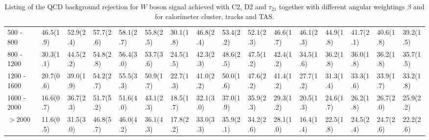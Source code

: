 \begin{table}
{\begin{tabular}{llllllllllllllll}
\multicolumn{1}{l||}{500 - 800} & 	\multicolumn{1}{l|}{46.5(1.9)} & \multicolumn{1}{l|}{52.9(2.4)} & \multicolumn{1}{l|}{57.7(2.6)} 						& \multicolumn{1}{l|}{58.1(2.7)} 	& \multicolumn{1}{l||}{55.8(2.5)} & \multicolumn{1}{l|}{30.1(1.8)} & \multicolumn{1}{l|}{46.8(2.4)} & \multicolumn{1}{l|}{53.4(2.2)} 						& \multicolumn{1}{l|}{52.1(2.3)} & \multicolumn{1}{l||}{46.6(1.7)} & \multicolumn{1}{l|}{46.1(2.3)} & \multicolumn{1}{l|}{44.9(1.8)} & \multicolumn{1}{l|}{41.7(2.1)} & \multicolumn{1}{l|}{40.6(1.8)} & \multicolumn{1}{l|}{39.2(1.5)} \\
\multicolumn{1}{l||}{800 - 1200} & 	\multicolumn{1}{l|}{30.3(1.1)} & \multicolumn{1}{l|}{44.5(2.2)} & \multicolumn{1}{l|}{54.8(2.8)} 						& \multicolumn{1}{l|}{56.4(3.0)} 	& \multicolumn{1}{l||}{53.7(3.6)} & \multicolumn{1}{l|}{24.5(1.5)} & \multicolumn{1}{l|}{42.3(2.3)} & \multicolumn{1}{l|}{48.6(2.5)} 						& \multicolumn{1}{l|}{47.5(1.2)} & \multicolumn{1}{l||}{42.4(1.2)} & \multicolumn{1}{l|}{34.5(1.6)} & \multicolumn{1}{l|}{36.2(1.8)} & \multicolumn{1}{l|}{36.0(1.8)} & \multicolumn{1}{l|}{36.2(1.8)} & \multicolumn{1}{l|}{35.7(1.5)} \\
\multicolumn{1}{l||}{1200 - 1600} & \multicolumn{1}{l|}{20.7(0.6)} & \multicolumn{1}{l|}{39.0(1.9)} & \multicolumn{1}{l|}{54.2(2.7)} 						& \multicolumn{1}{l|}{55.5(3.3)} 	& \multicolumn{1}{l||}{50.9(1.7)} & \multicolumn{1}{l|}{22.7(1.3)} & \multicolumn{1}{l|}{41.0(2.2)} & \multicolumn{1}{l|}{50.0(1.6)} 						& \multicolumn{1}{l|}{47.6(2.2)} & \multicolumn{1}{l||}{41.4(1.2)} & \multicolumn{1}{l|}{27.7(1.2)} & \multicolumn{1}{l|}{31.3(1.4)} & \multicolumn{1}{l|}{33.3(1.6)} & \multicolumn{1}{l|}{33.9(1.7)} & \multicolumn{1}{l|}{33.2(1.8)} \\
\multicolumn{1}{l||}{1600 - 2000} & \multicolumn{1}{l|}{16.6(0.7)} & \multicolumn{1}{l|}{36.7(2.3)} & \multicolumn{1}{l|}{51.7(5.2)} 		& \multicolumn{1}{l|}{51.6(4.0)} 					& \multicolumn{1}{l||}{43.1(2.3)} & \multicolumn{1}{l|}{18.5(1.7)} & \multicolumn{1}{l|}{32.1(3.0)} & \multicolumn{1}{l|}{37.0(1.9)} 						& \multicolumn{1}{l|}{35.9(2.3)} & \multicolumn{1}{l||}{29.3(1.2)} & \multicolumn{1}{l|}{20.5(1.3)} & \multicolumn{1}{l|}{24.6(1.7)} & \multicolumn{1}{l|}{26.2(1.8)} & \multicolumn{1}{l|}{26.7(2.0)} & \multicolumn{1}{l|}{25.9(2.2)} \\
\multicolumn{1}{l||}{$>2000$} & 	\multicolumn{1}{l|}{11.6(0.5)} & \multicolumn{1}{l|}{31.5(3.0)} & \multicolumn{1}{l|}{46.8(5.7)} 		& \multicolumn{1}{l|}{46.0(4.2)} 					& \multicolumn{1}{l||}{36.1(4.3)} & \multicolumn{1}{l|}{17.8(2.2)} & \multicolumn{1}{l|}{33.0(3.3)} & \multicolumn{1}{l|}{35.9(2.1)} 						& \multicolumn{1}{l|}{34.2(2.6)} & \multicolumn{1}{l||}{28.1(1.0)} & \multicolumn{1}{l|}{16.4(1.4)} & \multicolumn{1}{l|}{22.5(1.8)} & \multicolumn{1}{l|}{24.5(2.4)} & \multicolumn{1}{l|}{24.7(2.6)} & \multicolumn{1}{l|}{22.2(2.6)} \\ \hline
\end{tabular}}
\caption{Listing of the QCD background rejection for $W$ boson signal achieved with C2, D2 and $\tau_{21}$ together with different angular weightings $\beta$ and for calorimeter cluster, tracks and TAS.}\label{table:w_scan}
\end{table}

